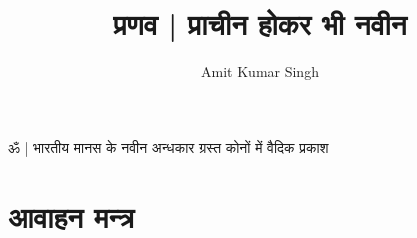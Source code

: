 \documentclass[oneside,12pt]{book} %
\title{ प्रणव | प्राचीन होकर भी नवीन  } %
\author{Amit Kumar Singh} %
\newcommand{\edition}{First Edition} %
\begin{document}

\thispagestyle{empty} %

ॐ | भारतीय मानस के नवीन अन्धकार ग्रस्त कोनों में वैदिक प्रकाश 

\newpage %


\tableofcontents %


\chapter{आवाहन मन्त्र} %
\end{document}
